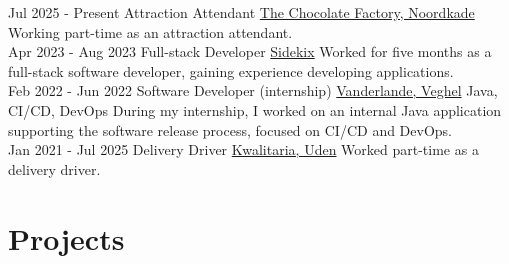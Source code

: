 \documentclass[letterpaper]{twentysecondcv_english}
\begin{document}
    \begin{twenty}

        \twentyitem
        {Jul 2025 -}
        {Present}
        {Attraction Attendant}
        {\href{https://www.thechocolatefactory-noordkade.com/}{The Chocolate Factory, Noordkade}}
        {}
        {
            Working part-time as an attraction attendant.
        } \\

        \twentyitem
        {Apr 2023 -}
        {Aug 2023}
        {Full-stack Developer}
        {\href{https://www.sidekix.nl/}{Sidekix}}
        {}
        {
            Worked for five months as a full-stack software developer,
            gaining experience developing applications.
        } \\

        \twentyitem
        {Feb 2022 -}
        {Jun 2022}
        {Software Developer (internship)}
        {\href{https://www.vanderlande.com/}{Vanderlande, Veghel}}
        {Java, CI/CD, DevOps}
        {
            During my internship, I worked on an internal Java application
        supporting the software release process, focused on CI/CD and DevOps.
        } \\

        \twentyitem
        {Jan 2021 -}
        {Jul 2025}
        {Delivery Driver}
        {\href{https://kwalitaria.nl/}{Kwalitaria, Uden}}
        {}
        {
            Worked part-time as a delivery driver.
        }

    \end{twenty}

    \vspace{6mm}

    \newpage

    \makesidebarSecond



    \section{Projects}
\end{document}
